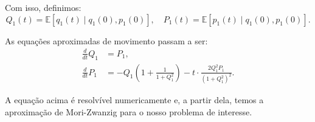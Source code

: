 Com isso, definimos:
\begin{equation*}
    Q_1(t) = \mathbb{E}[q_1(t) \mid q_1(0), p_1(0)], \quad P_1(t) = \mathbb{E}[p_1(t) \mid q_1(0), p_1(0)].
\end{equation*}

As equações aproximadas de movimento passam a ser:
\begin{align*}
    \frac{d}{dt} Q_1 &= P_1,\\
    \frac{d}{dt} P_1 &= -Q_1\left(1 + \frac{1}{1 + Q_1^2} \right) - t \cdot \frac{2 Q_1^2 P_1}{(1 + Q_1^2)^2}.
\end{align*}

A equação acima é resolvível numericamente e, a partir dela, temos a aproximação de Mori-Zwanzig para o nosso problema de interesse.